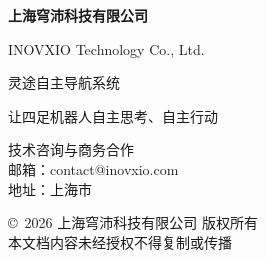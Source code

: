\documentclass[a4paper, 12pt, openany]{book}
\begin{document}
\clearpage
\thispagestyle{empty}
\vspace*{\fill}
\begin{center}
  {\Large\color{qpblue}\textbf{上海穹沛科技有限公司}}

  \vspace{0.5cm}

  {\small\color{qpgray}INOVXIO Technology Co., Ltd.}

  \vspace{1.5cm}

  {\large\color{qpdark}灵途自主导航系统}

  \vspace{0.3cm}

  {\color{qpgray}让四足机器人自主思考、自主行动}

  \vspace{2.5cm}

  {\color{qpgray}
  技术咨询与商务合作 \\[0.5em]
  邮箱：contact@inovxio.com \\[0.3em]
  地址：上海市
  }

  \vspace{2cm}

  {\small\color{qpgray!60}
  \copyright\ 2026 上海穹沛科技有限公司 版权所有 \\
  本文档内容未经授权不得复制或传播
  }
\end{center}
\vspace*{\fill}
\end{document}
